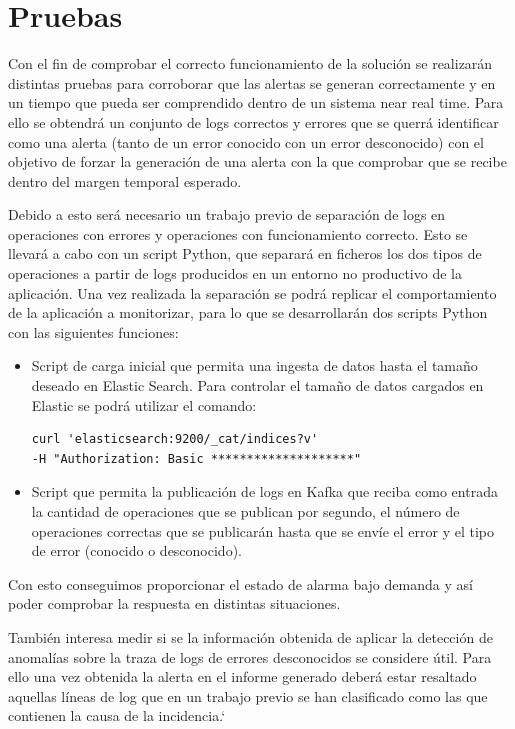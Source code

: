 \chapter{Pruebas}

Con el fin de comprobar el correcto funcionamiento de la solución se realizarán distintas pruebas para corroborar que las alertas se generan correctamente y en un tiempo que pueda ser comprendido dentro de un sistema near real time. Para ello se obtendrá un conjunto de logs correctos y errores que se querrá identificar como una alerta (tanto de un error conocido con un error desconocido) con el objetivo de forzar la generación de una alerta con la que comprobar que se recibe dentro del margen temporal esperado.

Debido a esto será necesario un trabajo previo de separación de logs en operaciones con errores y operaciones con funcionamiento correcto. Esto se llevará a cabo con un script Python, que separará en ficheros los dos tipos de operaciones a partir de logs producidos en un entorno no productivo de la aplicación. Una vez realizada la separación se podrá replicar el comportamiento de la aplicación a monitorizar, para lo que se desarrollarán dos scripts Python con las siguientes funciones:

\begin{itemize}
\item Script de carga inicial que permita una ingesta de datos hasta el tamaño deseado en Elastic Search. Para controlar el tamaño de datos cargados en Elastic se podrá utilizar el comando:

\begin{verbatim}
curl 'elasticsearch:9200/_cat/indices?v' 
-H "Authorization: Basic ********************"
\end{verbatim}

\item Script que permita la publicación de logs en Kafka que reciba como entrada la cantidad de operaciones que se publican por segundo, el número de operaciones correctas que se publicarán hasta que se envíe el error y el tipo de error (conocido o desconocido).
\end{itemize}

Con esto conseguimos proporcionar el estado de alarma bajo demanda y así poder comprobar la respuesta en distintas situaciones.

También interesa medir si se la información obtenida de aplicar la detección de anomalías sobre la traza de logs de errores desconocidos se considere útil. Para ello una vez obtenida la alerta en el informe generado deberá estar resaltado aquellas líneas de log que en un trabajo previo se han clasificado como las que contienen la causa de la incidencia.`

